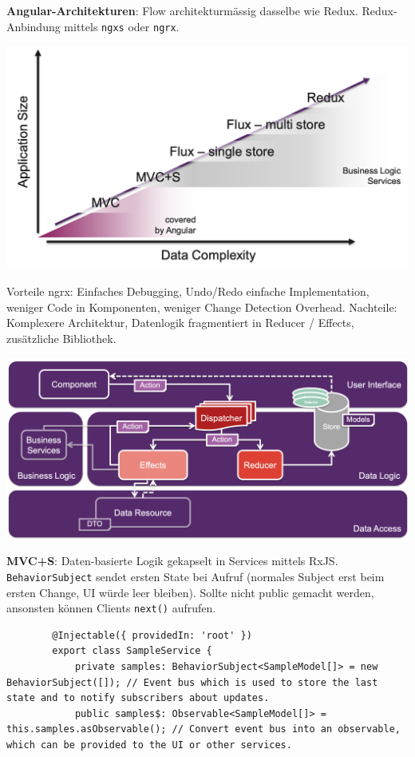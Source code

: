 \documentclass[10pt,landscape]{article}
\begin{document}
\begin{multicols}{2}
        \textbf{Angular-Architekturen}: Flow architekturmässig dasselbe wie Redux.
        Redux-Anbindung mittels \lstinline{ngxs} oder \lstinline{ngrx}.

        \includegraphics[width=\linewidth]{angular_architecture_big_picture}

        Vorteile ngrx: Einfaches Debugging, Undo/Redo einfache Implementation, weniger Code in Komponenten, weniger Change Detection Overhead.
        Nachteile: Komplexere Architektur, Datenlogik fragmentiert in Reducer / Effects, zusätzliche Bibliothek.

        \includegraphics[width=\linewidth]{angular_ngrx_architecture}

        \textbf{MVC+S}: Daten-basierte Logik gekapselt in Services mittels RxJS.
        \lstinline{BehaviorSubject} sendet ersten State bei Aufruf (normales Subject erst beim ersten Change, UI würde leer bleiben).
        Sollte nicht public gemacht werden, ansonsten können Clients \lstinline{next()} aufrufen.

        \begin{lstlisting}
        @Injectable({ providedIn: 'root' })
        export class SampleService {
            private samples: BehaviorSubject<SampleModel[]> = new BehaviorSubject([]); // Event bus which is used to store the last state and to notify subscribers about updates.
            public samples$: Observable<SampleModel[]> = this.samples.asObservable(); // Convert event bus into an observable, which can be provided to the UI or other services.


\end{lstlisting}
\end{multicols}
\end{document}
